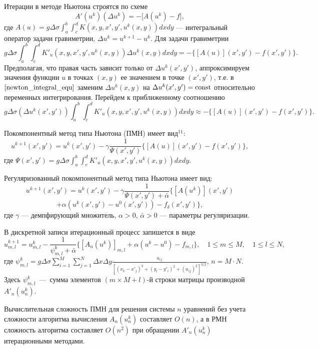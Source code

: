 \documentclass[%
autoref,     %
href,        %
colorlinks,  %
]{disser}
\begin{document}
	Итерации в методе Ньютона строятся по схеме
$$A'(u^k)(\Delta u^k)=-\big[A(u^k)-f\big],$$ где $A(u)=g\Delta\sigma\int_{a}^{b}\int_{c}^{d}K(x,y, x',y',u^k(x,y))dxdy$ --- интегральный оператор задачи гравиметрии, $\Delta u^k=u^{k+1}-u^k$.
Для задачи гравиметрии
\begin{equation}\label{newton_integral_equ}
	g\Delta\sigma\int_{a}^{b}\int_{c}^{d}K'_u(x,y, x',y',u^k(x,y))\Delta u^k(x,y) dxdy=-\{[A(u)](x',y')-f(x',y')\}.
\end{equation}
Предполагая, что правая часть зависит только от $\Delta u^k(x',y')$, аппроксимируем значения функции $u$ в точках $(x,y)$ ее значением в точке $(x',y')$, т.е. в $\eqref{newton_integral_equ}$ заменим  
$\Delta u^k(x,y)$ на $\Delta u^k(x',y')=\textnormal{const}$ относительно переменных интегрирования. Перейдем к приближенному соотношению
$$g\Delta\sigma(\Delta u^k(x',y'))\int_{a}^{b}\int_{c}^{d}K'_u(x,y, x',y',u^k(x,y)) dxdy\approx -\{[A(u)](x',y')-f(x',y')\}.$$


Покомпонентный метод типа Ньютона (ПМН) имеет вид$^{11}$:
$$u^{k+1}(x',y')=u^k(x',y')-\gamma\frac{1}{\varPsi(x',y')}\{[A(u)](x',y')-f(x',y')\},$$
где $\varPsi(x',y')=g\Delta\sigma\int_{a}^{b}\int_{c}^{d}K'_u(x,y, x',y',u^k(x,y)) dxdy.$

Регуляризованный покомпонентный метод типа Ньютона имеет вид:
$$u^{k+1}(x',y')=u^k(x',y')-\gamma\frac{1}{\varPsi(x',y')+\bar{\alpha}}\{[A(u^k)](x',y')$$ 
$$+\alpha (u^k(x',y')-u^0(x',y'))-f_\delta(x',y')\},$$
где $\gamma$ --- демпфирующий множитель, $\alpha>0$, $\bar{\alpha} >0$ --- параметры регуляризации.

В дискретной записи итерационный процесс запишется в виде
$$u_{m,l}^{k+1}=u_{m,l}^k-\frac{1}{\psi_{m,l}^k+\bar\alpha}\{[A_n(u^k)]_{m,l} + \alpha(u^k-u^0) -f_{m,l}\},\quad 1\le m \le M, \quad 1\le l \le N,$$
{\scriptsize
	\let\thefootnote\relax\let\thefootnote\relax{}
}
где $\psi_{m,l}^k=g\Delta\sigma\sum\limits_{i=1}^{M}\sum\limits_{j=1}^{N}
\Delta x\Delta y\frac{u_{ij}}{[(x_k-x'_j)^2+(y_l-y'_i)^2+(u_{ij})^2]^{3/2}}$, $n=M\cdot N$.
Здесь $\psi_{m,l}^k$~---~сумма элементов $(m\times M + l)$-й строки матрицы производной $A'_n(u_n^k)$. 

Вычислительная сложность ПМН для решения системы $n$ уравнений без учета сложности алгоритма вычисления $A_n(u_n^k)$ составляет $O(n)$, а в РМН сложность алгоритма составляет $O(n^2)$ при обращении $A'_n(u_n^k)$ итерационными методами.
\end{document}
